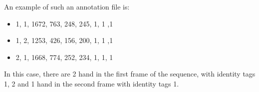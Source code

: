 An example of such an annotation file is:
\begin{itemize}
	\item 1, 1, 1672, 763, 248, 245, 1, 1 ,1
	\item 1, 2, 1253, 426, 156, 200, 1, 1 ,1
	\item 2, 1, 1668, 774, 252, 234, 1, 1, 1
\end{itemize}
In this case, there are 2 hand in the first frame of the sequence, with identity tags 1, 2 and 1 hand in the second frame with identity tags 1.
